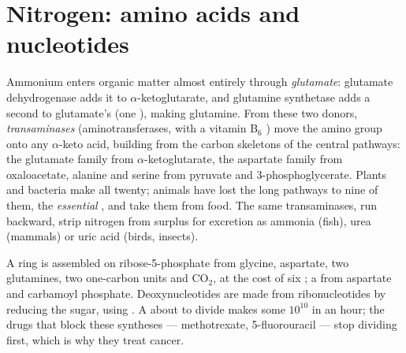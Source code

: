 \section{Nitrogen: amino acids and nucleotides}

\begin{definition}\label{def:b1:biosyntheses-integration:nitrogen}
Ammonium enters organic matter almost entirely through
\emph{glutamate}: glutamate dehydrogenase adds it to
$\alpha$-ketoglutarate, and glutamine synthetase adds a second to
glutamate's  (one ), making glutamine. From these two
donors, \emph{transaminases} (aminotransferases, with a vitamin
B$_6$ ) move the amino group onto any $\alpha$-keto acid,
building  from the carbon skeletons of the central
pathways: the glutamate family from $\alpha$-ketoglutarate, the
aspartate family from oxaloacetate, alanine and serine from pyruvate
and 3-phosphoglycerate. Plants and bacteria make all twenty; animals
have lost the long pathways to nine of them, the \emph{essential} , and take them from food. The same transaminases, run backward,
strip nitrogen from surplus  for excretion as ammonia (fish),
urea (mammals) or uric acid (birds, insects).
\end{definition}

\begin{example}[Nucleotides]\label{ex:b1:biosyntheses-integration:nucleotides}
A  ring is assembled on ribose-5-phosphate from glycine,
aspartate, two glutamines, two one-carbon units and $\mathrm{CO_2}$,
at the cost of six ; a  from aspartate and carbamoyl
phosphate. Deoxynucleotides are made from ribonucleotides by reducing
the sugar, using . A  about to divide makes some $10^{10}$
 in an hour; the drugs that block these syntheses ---
methotrexate, 5-fluorouracil --- stop dividing  first, which is
why they treat cancer.
\end{example}

